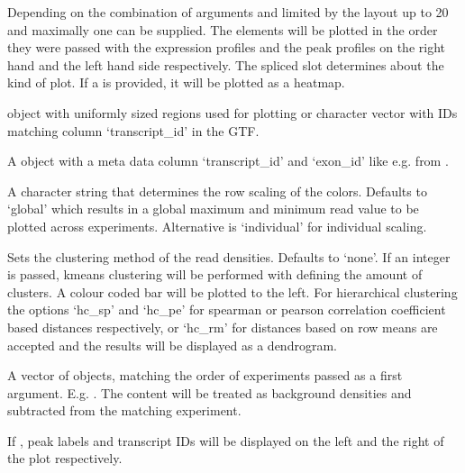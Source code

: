 \documentclass[letterpaper]{book}
\begin{document}
\begin{Arguments}
\begin{ldescription}
\item[\code{...}] 
Depending on the combination of arguments and limited by the layout up to 20  and maximally one  can be supplied. The elements will be plotted in the order they were passed with the expression profiles and the peak profiles on the right hand and the left hand side respectively. The spliced slot determines about the kind of plot. If a  is provided, it will be plotted as a heatmap.

\item[\code{regions}] 
 object with uniformly sized regions used for plotting or character vector with IDs matching column `transcript\_id' in the GTF. 

\item[\code{gtf}] 
A  object with a meta data column `transcript\_id' and `exon\_id' like e.g. from . 

\item[\code{scale}] 
A character string that determines the row scaling of the colors. Defaults to `global' which results in a global maximum and minimum read value to be plotted across experiments. Alternative is `individual' for individual scaling.

\item[\code{cluster}] 
Sets the clustering method of the read densities. Defaults to `none'. If an integer is passed, kmeans clustering will be performed with  defining the amount of clusters. A colour coded bar will be plotted to the left. For hierarchical clustering the options `hc\_sp' and `hc\_pe' for spearman or pearson correlation coefficient based distances respectively, or `hc\_rm' for distances based on row means are accepted and the results will be displayed as a dendrogram.

\item[\code{control}] 
A vector of  objects, matching the order of experiments passed as a first argument. E.g. . The content will be treated as background densities and subtracted from the matching experiment.

\item[\code{show\_names}] 
If , peak labels and transcript IDs will be displayed on the left and the right of the plot respectively. 


\end{ldescription}
\end{Arguments}
\end{document}
